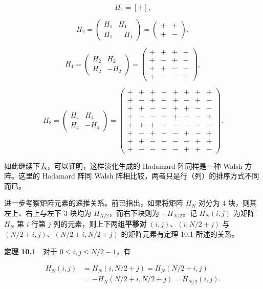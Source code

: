 \[
H_1=[+],
\]

\[
H_2=\begin{pmatrix}H_1&H_1\\H_1&-H_1\end{pmatrix}=\begin{pmatrix}+&+\\+&-\end{pmatrix},
\]

\[
H_4=\begin{pmatrix}H_2&H_2\\H_2&-H_2\end{pmatrix}=\begin{pmatrix}
+&+&+&+\\
+&-&+&-\\
+&+&-&-\\
+&-&-&+
\end{pmatrix},
\]

\[
H_8=\begin{pmatrix}H_4&H_4\\H_4&-H_4\end{pmatrix}=\begin{pmatrix}
+&+&+&+&+&+&+&+\\
+&-&+&-&+&-&+&-\\
+&+&-&-&+&+&-&-\\
+&-&-&+&+&-&-&+\\
+&+&+&+&-&-&-&-\\
+&-&+&-&-&+&-&+\\
+&+&-&-&-&-&+&+\\
+&-&-&+&-&+&+&-
\end{pmatrix}.
\]

如此继续下去，可以证明，这样演化生成的 Hadamard 阵同样是一种 Walsh 方阵。这里的 Hadamard 阵同 Walsh 阵相比较，两者只是行（列）的排序方式不同而已。

进一步考察矩阵元素的递推关系。前已指出，如果将矩阵 \(H_N\) 对分为 4 块，则其左上、右上与左下 3 块均为 \(H_{N/2}\)，而右下块则为 \(-H_{N/2}\)。记 \(H_N(i,j)\) 为矩阵 \(H_N\) 第 \(i\) 行第 \(j\) 列的元素，则上下两组\textbf{平移对} \((i,j)\)、\((i,N/2+j)\) 与 \((N/2+i,j)\)、\((N/2+i,N/2+j)\) 的矩阵元素有定理 10.1 所述的关系。

\textbf{定理 10.1}　对于 \(0\leqslant i,j\leqslant N/2-1\)，有

\[
\begin{aligned}
H_N(i,j)&=H_N(i,N/2+j)=H_N(N/2+i,j)\\
&=-H_N(N/2+i,N/2+j)=H_{N/2}(i,j).
\end{aligned}
\]

\clearpage

